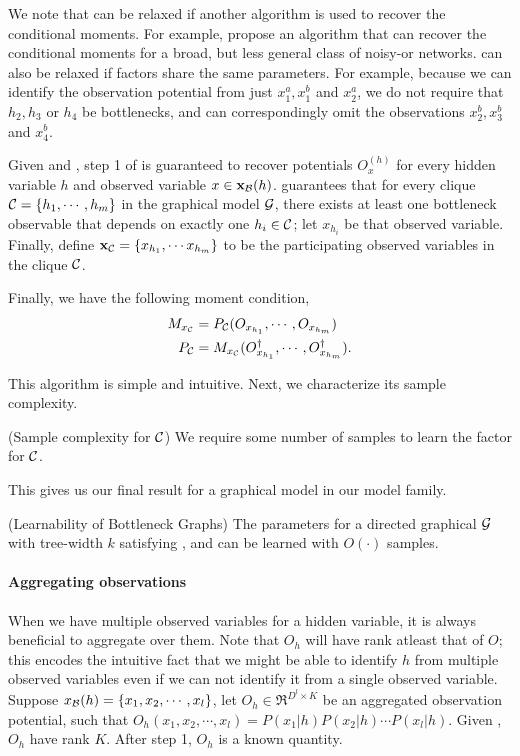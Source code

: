 We note that  can be relaxed if another
  algorithm is used to recover the conditional moments. For example,
  \citet{halpern13noisyor} propose an algorithm that can recover the
  conditional moments for a broad, but less general class of noisy-or
  networks.
 can also be relaxed if factors share the same
  parameters. 
For example, because we can identify the observation potential from just
  $x^a_1, x^b_1$ and $x^a_2$, we do not require that $h_2, h_3$ or $h_4$
  be bottlenecks, and can correspondingly omit the observations $x^b_2,
  x^b_3$ and $x^b_4$.

Given  and , step
  1 of  is guaranteed to recover potentials
  $O^{(h)}_{x}$ for every hidden variable $h$ and observed variable $x \in
  \mathbf{x}_{\mathcal{B}}(h)$.
 guarantees that for every clique $\mathcal{C}
  = \{h_1, \cdots, h_m\}$ in the graphical model $\mathcal{G}$, there exists at
  least one bottleneck observable that depends on exactly one $h_i \in
  \mathcal{C}$; let $x_{h_i}$ be that observed variable\verify. 
Finally, define $\mathbf{x}_{\mathcal{C}} = \{x_{h_1}, \cdots x_{h_m}\}$ to be the
  participating observed variables in the clique $\mathcal{C}$.

Finally, we have the following moment condition,
\begin{align*}
  M_{x_{\mathcal{C}}} &= P_{\mathcal{C}}(O_{x_{h_1}}, \cdots, O_{x_{h_m}}) \\
  P_{\mathcal{C}} &= M_{x_{\mathcal{C}}}({O}^{\dagger}_{x_{h_1}}, \cdots, {O}^{\dagger}_{x_{h_m}}).
\end{align*}

This algorithm is simple and intuitive. Next, we characterize its sample complexity.

\begin{lemma}(Sample complexity for $\mathcal{C}$)
We require some number of samples to learn the factor for $\mathcal{C}$.
\end{lemma}

This gives us our final result for a graphical model in our model
family.
\begin{theorem}(Learnability of Bottleneck Graphs)
The parameters for a directed graphical $\mathcal{G}$ with tree-width $k$
satisfying ,  and
 can be learned with $O(\cdot)$ samples.
\end{theorem}


\paragraph{Aggregating observations}

When we have multiple observed variables for a hidden variable, it is
  always beneficial to aggregate over them.
Note that $O_h$ will have rank atleast that of $O$; this encodes the
  intuitive fact that we might be able to identify $h$ from multiple
  observed variables even if we can not identify it from a single
  observed variable. 
Suppose $x_{\mathcal{B}}(h) = \{x_1, x_2, \cdots, x_l\}$, let $O_h \in
  \Re^{D^l \times K}$ be an
  aggregated observation potential, such that $O_h(x_1, x_2, \cdots,
  x_l) = P(x_1|h) P(x_2|h) \cdots P(x_l|h)$.
Given , $O_h$ have rank $K$.
After step 1, $O_h$ is a known quantity.
